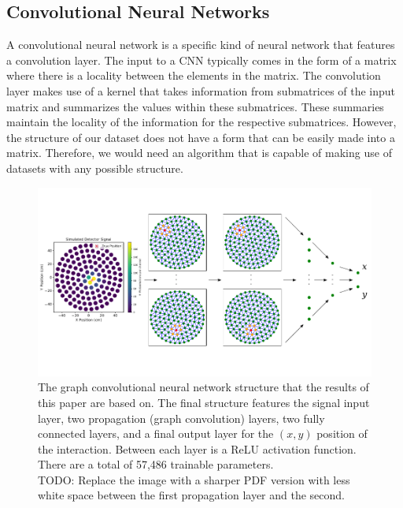 \documentclass[thesis.tex]{subfiles}
\begin{document}
\subsection{Convolutional Neural Networks}
A convolutional neural network is a specific kind of neural network that features a convolution layer.
The input to a CNN typically comes in the form of a matrix where there is a locality between the elements in the matrix.
The convolution layer makes use of a kernel that takes information from submatrices of the input matrix and summarizes the values within these submatrices.
These summaries maintain the locality of the information for the respective submatrices.
However, the structure of our dataset does not have a form that can be easily made into a matrix.
Therefore, we would need an algorithm that is capable of making use of datasets with any possible structure.
\begin{figure}[t]
	\centering
	\includegraphics[width=\linewidth]{figures/gcnn_architecture.pdf}
	\caption{
	The graph convolutional neural network structure that the results of this paper are based on.
	The final structure features the signal input layer, two propagation (graph convolution) layers, two fully connected layers, and a final output layer for the $(x,y)$ position of the interaction.
	Between each layer is a ReLU activation function.
	There are a total of 57,486 trainable parameters.
	\\ TODO: Replace the image with a sharper PDF version with less white space between the first propagation layer and the second.
	}
	\label{fig:figures/GCNN_Structure}
\end{figure}
\end{document}
